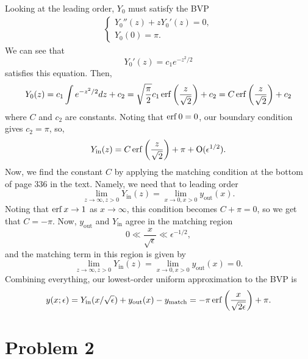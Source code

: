 \documentclass{article}
\begin{document}
Looking at the leading order, $Y_0$ must satisfy the BVP
  \begin{align*}
    \begin{cases}  Y_0''(z) + z Y_0'(z) = 0,\\
      Y_0(0) = \pi. 
      \end{cases}
  \end{align*}
We can see that 
\[
Y_0'(z)=c_1e^{-z^2/2} 
\]
satisfies this equation. Then,
\begin{align*}
Y_0(z)=c_1\int e^{-z^2/2}dz+c_2=\sqrt{\frac{\pi}{2}}c_1\operatorname{erf}\left(\frac{z}{\sqrt{2}}\right)+c_2=C\operatorname{erf}\left(\frac{z}{\sqrt{2}}\right)+c_2
\end{align*}
where $C$ and $c_2$ are constants. Noting that $\operatorname{erf}0=0$, our boundary condition gives $c_2=\pi$, so,
\[
Y_{\text{in}}(z)=C\operatorname{erf}\left(\frac{z}{\sqrt{2}}\right)+\pi+\operatorname{O}(\epsilon^{1/2}).
\]
Now, we find the constant $C$ by applying the matching condition at the bottom of page 336 in the text. Namely, we need that to leading order
\[
\lim_{z\to\infty,z>0}Y_{\text{in}}(z)=\lim_{x\to0,x>0}y_{\text{out}}(x).
\]
Noting that $\operatorname{erf} x\to1$ as $x\to\infty$, this condition becomes $C+\pi=0$, so we get that $C=-\pi$. Now, $y_{\text{out}}$ and $Y_{\text{in}}$ agree in the matching region 
\[
0\ll\frac{x}{\sqrt{\epsilon}}\ll\epsilon^{-1/2},
\]
and the matching term in this region is given by 
\[
\lim_{z\to\infty,z>0}Y_{\text{in}}(z)=\lim_{x\to0,x>0}y_{\text{out}}(x)=0.
\]
Combining everything, our lowest-order uniform approximation to the BVP is
\[
y(x;\epsilon)=Y_{\text{in}}(x/\sqrt{\epsilon})+y_{\text{out}}(x)-y_{\text{match}}=-\pi\operatorname{erf}\left(\frac{x}{\sqrt{2\epsilon}}\right)+\pi.
\]
  
\section{Problem 2}
\end{document}
